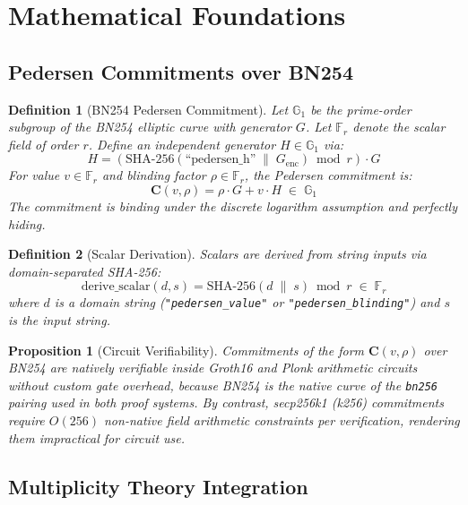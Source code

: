 \documentclass[11pt,letterpaper]{article}
\newtheorem{definition}{Definition}[section]
\newtheorem{proposition}{Proposition}[section]
\begin{document}
\section{Mathematical Foundations}

\subsection{Pedersen Commitments over BN254}

\begin{definition}[BN254 Pedersen Commitment]
Let \(\mathbb{G}_1\) be the prime-order subgroup of the BN254 elliptic curve with
generator \(G\). Let \(\mathbb{F}_r\) denote the scalar field of order \(r\).
Define an independent generator \(H \in \mathbb{G}_1\) via:
\[
  H = \left( \text{SHA-256}(\text{``pedersen\_h''} \;\|\; G_{\text{enc}}) \bmod r \right) \cdot G
\]
For value \(v \in \mathbb{F}_r\) and blinding factor \(\rho \in \mathbb{F}_r\), the
Pedersen commitment is:
\[
  \mathbf{C}(v, \rho) = \rho \cdot G + v \cdot H \;\in\; \mathbb{G}_1 \tag{1}
\]
The commitment is binding under the discrete logarithm assumption and perfectly
hiding.
\end{definition}

\begin{definition}[Scalar Derivation]
Scalars are derived from string inputs via domain-separated SHA-256:
\[
  \text{derive\_scalar}(d, s) = \text{SHA-256}(d \;\|\; s) \bmod r \;\in\; \mathbb{F}_r \tag{2}
\]
where \(d\) is a domain string (\texttt{"pedersen\_value"} or
\texttt{"pedersen\_blinding"}) and \(s\) is the input string.
\end{definition}

\begin{proposition}[Circuit Verifiability]
Commitments of the form \(\mathbf{C}(v,\rho)\) over BN254 are natively verifiable
inside Groth16 and Plonk arithmetic circuits without custom gate overhead, because
BN254 is the native curve of the \texttt{bn256} pairing used in both proof systems.
By contrast, secp256k1 (k256) commitments require \(O(256)\) non-native field
arithmetic constraints per verification, rendering them impractical for circuit use.
\end{proposition}

\subsection{Multiplicity Theory Integration}
\end{document}

